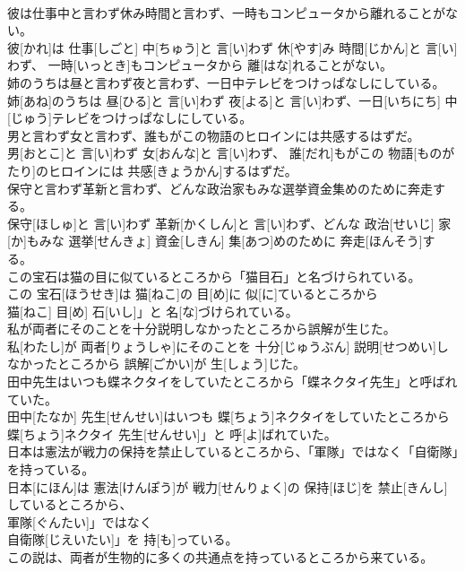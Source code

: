 \documentclass[8pt]{extreport}
\begin{document}
\begin{CJK}{UTF8}{min}
\\	彼は仕事中と言わず休み時間と言わず、一時もコンピュータから離れることがない。	
\\	彼[かれ]は 仕事[しごと] 中[ちゅう]と 言[い]わず 休[やす]み 時間[じかん]と 言[い]わず、 一時[いっとき]もコンピュータから 離[はな]れることがない。
\\	姉のうちは昼と言わず夜と言わず、一日中テレビをつけっぱなしにしている。	
\\	姉[あね]のうちは 昼[ひる]と 言[い]わず 夜[よる]と 言[い]わず、一日[いちにち] 中[じゅう]テレビをつけっぱなしにしている。
\\	男と言わず女と言わず、誰もがこの物語のヒロインには共感するはずだ。	
\\	男[おとこ]と 言[い]わず 女[おんな]と 言[い]わず、 誰[だれ]もがこの 物語[ものがたり]のヒロインには 共感[きょうかん]するはずだ。
\\	保守と言わず革新と言わず、どんな政治家もみな選挙資金集めのために奔走する。	
\\	保守[ほしゅ]と 言[い]わず 革新[かくしん]と 言[い]わず、どんな 政治[せいじ] 家[か]もみな 選挙[せんきょ] 資金[しきん] 集[あつ]めのために 奔走[ほんそう]する。
\\	この宝石は猫の目に似ているところから「猫目石」と名づけられている。	
\\	この 宝石[ほうせき]は 猫[ねこ]の 目[め]に 似[に]ているところから
\\	猫[ねこ] 目[め] 石[いし]」と 名[な]づけられている。
\\	私が両者にそのことを十分説明しなかったところから誤解が生じた。	
\\	私[わたし]が 両者[りょうしゃ]にそのことを 十分[じゅうぶん] 説明[せつめい]しなかったところから 誤解[ごかい]が 生[しょう]じた。
\\	田中先生はいつも蝶ネクタイをしていたところから「蝶ネクタイ先生」と呼ばれていた。	
\\	田中[たなか] 先生[せんせい]はいつも 蝶[ちょう]ネクタイをしていたところから
\\	蝶[ちょう]ネクタイ 先生[せんせい]」と 呼[よ]ばれていた。
\\	日本は憲法が戦力の保持を禁止しているところから、「軍隊」ではなく「自衛隊」を持っている。	
\\	日本[にほん]は 憲法[けんぽう]が 戦力[せんりょく]の 保持[ほじ]を 禁止[きんし]しているところから、
\\	軍隊[ぐんたい]」ではなく
\\	自衛隊[じえいたい]」を 持[も]っている。
\\	この説は、両者が生物的に多くの共通点を持っているところから来ている。	

\end{CJK}
\end{document}
